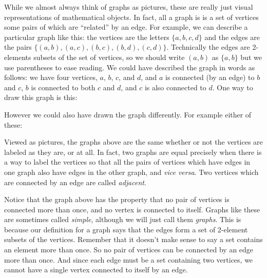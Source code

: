\documentclass[12pt]{article}
\begin{document}
While we almost always think of graphs as pictures, these are really just visual representations of mathematical objects.  In fact, all a graph is is a set of vertices some pairs of which are ``related'' by an edge.  For example, we can describe a particular graph like this: the vertices are the letters $\{a,b,c,d\}$ and the edges are the pairs $\{(a,b), (a,c), (b,c), (b,d), (c,d)\}$.  Technically the edges are 2-elements subsets of the set of vertices, so we should write $(a,b)$ as $\{a,b\}$ but we use parentheses to ease reading.  We could have described the graph in words as follows: we have four vertices, $a$, $b$, $c$, and $d$, and $a$ is connected (by an edge) to $b$ and $c$, $b$ is connected to both $c$ and $d$, and $c$ is also connected to $d$.  One way to draw this graph is this:
\begin{center}
\end{center}

However we could also have drawn the graph differently.  For example either of these:

\begin{center}
  \hspace{1in}
\end{center}

Viewed as pictures, the graphs above are the same whether or not the vertices are labeled as they are, or at all.  In fact, two graphs are equal precisely when there is a way to label the vertices so that all the pairs of vertices which have edges in one graph also have edges in the other graph, and \textit{vice versa}.  Two vertices which are connected by an edge are called \emph{adjacent}.

Notice that the graph above has the property that no pair of vertices is connected more than once, and no vertex is connected to itself.  Graphs like these are sometimes called {\em simple}, although we will just call them {\em graphs}.  This is because our definition for a graph says that the edges form a set of 2-element subsets of the vertices.  Remember that it doesn't make sense to say a set contains an element more than once.  So no pair of vertices can be connected by an edge more than once.  And since each edge must be a set containing two vertices, we cannot have a single vertex connected to itself by an edge.
\end{document}
